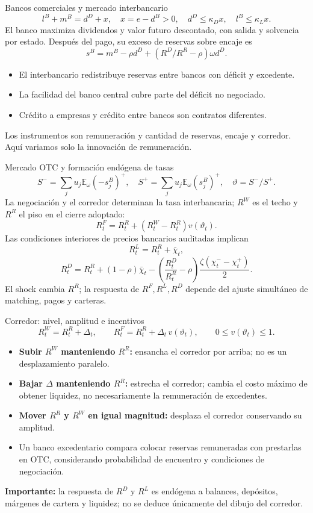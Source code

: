 \documentclass[aspectratio=169,11pt]{beamer}
\begin{document}
\begin{frame}{Bancos comerciales y mercado interbancario}
\[
l^B+m^B=d^D+x,\quad x=e-d^B>0,\quad
 d^D\leq\kappa_Dx,\quad l^B\leq\kappa_Lx.
\]
El banco maximiza dividendos y valor futuro descontado, con salida y solvencia
por estado. Después del pago, su exceso de reservas sobre encaje es
\[
s^B=m^B-\rho d^D+(R^D/R^R-\rho)\omega d^D.
\]
\begin{itemize}
\item El interbancario redistribuye reservas entre bancos con déficit y excedente.
\item La facilidad del banco central cubre parte del déficit no negociado.
\item Crédito a empresas y crédito entre bancos son contratos diferentes.
\end{itemize}
Los instrumentos son remuneración y cantidad de reservas, encaje y corredor.
Aquí variamos solo la innovación de remuneración.
\end{frame}

\begin{frame}{Mercado OTC y formación endógena de tasas}
\small
\[
S^-=\sum_j u_j\mathbb E_\omega(-s_j^B)^+,\quad
S^+=\sum_j u_j\mathbb E_\omega(s_j^B)^+,\quad
\vartheta=S^-/S^+.
\]
La negociación y el corredor determinan la tasa interbancaria; $R^W$ es el techo y $R^R$ el piso en el cierre adoptado:
\[
R^F_t=R^R_t+(R^W_t-R^R_t)v(\vartheta_t).
\]
Las condiciones interiores de precios bancarios auditadas implican
\[
R^L_t=R^R_t+\bar\chi_t,
\]
\[
R^D_t=R^R_t+(1-\rho)\bar\chi_t-
\left(\frac{R^D_t}{R^R_t}-\rho\right)
\frac{\zeta(\chi^-_t-\chi^+_t)}{2}.
\]
\footnotesize
El shock cambia $R^R$; la respuesta de $R^F,R^L,R^D$
depende del ajuste simultáneo de matching, pagos y carteras.
\end{frame}

\begin{frame}{Corredor: nivel, amplitud e incentivos}
\small
\[
R^W_t=R^R_t+\Delta_t,\qquad
R^F_t=R^R_t+\Delta_t\,v(\vartheta_t),\qquad 0\leq v(\vartheta_t)\leq 1.
\]
\begin{itemize}
\item \textbf{Subir $R^W$ manteniendo $R^R$:} ensancha el corredor por arriba; no es un desplazamiento paralelo.
\item \textbf{Bajar $\Delta$ manteniendo $R^R$:} estrecha el corredor; cambia el costo máximo de obtener liquidez, no necesariamente la remuneración de excedentes.
\item \textbf{Mover $R^R$ y $R^W$ en igual magnitud:} desplaza el corredor conservando su amplitud.
\item Un banco excedentario compara colocar reservas remuneradas con prestarlas en OTC, considerando probabilidad de encuentro y condiciones de negociación.
\end{itemize}
\textbf{Importante:} la respuesta de $R^D$ y $R^L$ es endógena a balances, depósitos, márgenes de cartera y liquidez; no se deduce únicamente del dibujo del corredor.
\end{frame}
\end{document}
